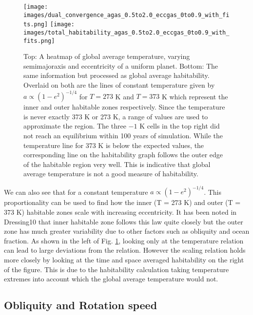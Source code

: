 \documentclass[12pt, onecolumn]{revtex4-2}    %
\begin{document}
\begin{figure}
    \texttt{[image: images/dual\_convergence\_agas\_0.5to2.0\_eccgas\_0to0.9\_with\_fits.png]}
    \texttt{[image: images/total\_habitability\_agas\_0.5to2.0\_eccgas\_0to0.9\_with\_fits.png]}
    \caption{Top: A heatmap of global average temperature, varying semimajoraxis and eccentricity of a uniform planet.
        Bottom: The same information but processed as global average habitability.
        Overlaid on both are the lines of constant temperature given by $a \propto (1-e^2)^{-1/4}$ for $T = 273$ K and $T = 373$ K which represent the inner and outer habitable zones respectively.
        Since the temperature is never exactly 373 K or 273 K, a range of values are used to approximate the region.
        The three $-1$ K cells in the top right did not reach an equilibrium within 100 years of simulation.
        While the temperature line for 373 K is below the expected values, the corresponding line on the habitability graph follows the outer edge of the habitable region very well.
        This is indicative that global average temperature is not a good measure of habitability.
    }
    \label{fig:semiecc_temphab}
\end{figure}

We can also see that for a constant temperature $a \propto (1-e^2)^{-1/4}$.
This proportionality can be used to find how the inner (T = 273 K) and outer (T = 373 K) habitable zones scale with increasing eccentricity.
It has been noted in Dressing10 that inner habitable zone follows this law quite closely but the outer zone has much greater variability due to other factors such as obliquity and ocean fraction.
As shown in the left of Fig. \ref{fig:semiecc_temphab}, looking only at the temperature relation can lead to large deviations from the relation.
However the scaling relation holds more closely by looking at the time and space averaged habitability on the right of the figure.
This is due to the habitability calculation taking temperature extremes into account which the global average temperature would not.

\subsection{Obliquity and Rotation speed} \label{ssec:obliqrotat}
\end{document}
